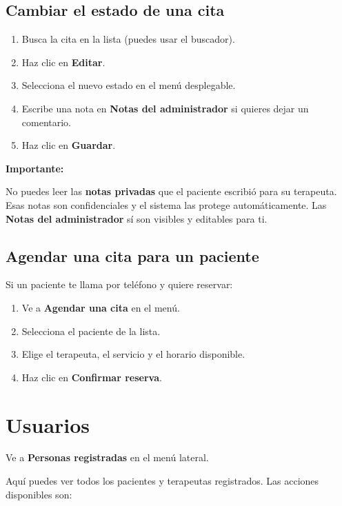 \documentclass[12pt,a4paper]{article}
\newenvironment{importante}{%
  \begin{mdframed}[backgroundcolor=grayLight,linecolor=dangerColor,linewidth=1.5pt,innerleftmargin=10pt]
  \textcolor{dangerColor}{\textbf{Importante:}} 
}{%
  \end{mdframed}
}
\begin{document}
\subsection{Cambiar el estado de una cita}

\begin{enumerate}
  \item Busca la cita en la lista (puedes usar el buscador).
  \item Haz clic en \textbf{Editar}.
  \item Selecciona el nuevo estado en el menú desplegable.
  \item Escribe una nota en \textbf{Notas del administrador} si quieres dejar un comentario.
  \item Haz clic en \textbf{Guardar}.
\end{enumerate}

\begin{importante}
  No puedes leer las \textbf{notas privadas} que el paciente escribió para su terapeuta.
  Esas notas son confidenciales y el sistema las protege automáticamente.
  Las \textbf{Notas del administrador} sí son visibles y editables para ti.
\end{importante}

\subsection{Agendar una cita para un paciente}

Si un paciente te llama por teléfono y quiere reservar:
\begin{enumerate}
  \item Ve a \textbf{Agendar una cita} en el menú.
  \item Selecciona el paciente de la lista.
  \item Elige el terapeuta, el servicio y el horario disponible.
  \item Haz clic en \textbf{Confirmar reserva}.
\end{enumerate}

\section{Usuarios}

Ve a \textbf{Personas registradas} en el menú lateral.

Aquí puedes ver todos los pacientes y terapeutas registrados. Las acciones
disponibles son:
\end{document}
